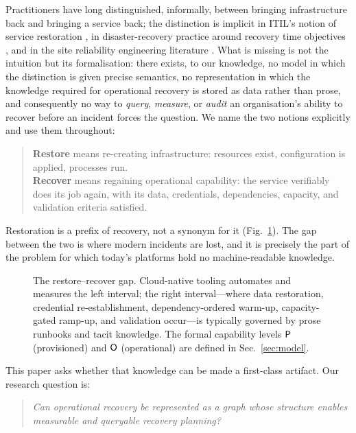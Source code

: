 Practitioners have long distinguished, informally, between bringing infrastructure back and bringing a service back; the distinction is implicit in ITIL's notion of service restoration \citep{itil2019}, in disaster-recovery practice around recovery time objectives \citep{nist2010contingency}, and in the site reliability engineering literature \citep{beyer2016sre}. What is missing is not the intuition but its formalisation: there exists, to our knowledge, no model in which the distinction is given precise semantics, no representation in which the knowledge required for operational recovery is stored as data rather than prose, and consequently no way to \emph{query}, \emph{measure}, or \emph{audit} an organisation's ability to recover before an incident forces the question. We name the two notions explicitly and use them throughout:

\begin{quote}
\textbf{Restore} means re-creating infrastructure: resources exist, configuration is applied, processes run.\\
\textbf{Recover} means regaining operational capability: the service verifiably does its job again, with its data, credentials, dependencies, capacity, and validation criteria satisfied.
\end{quote}

\noindent Restoration is a prefix of recovery, not a synonym for it (Fig.~\ref{fig:gap}). The gap between the two is where modern incidents are lost, and it is precisely the part of the problem for which today's platforms hold no machine-readable knowledge.

\begin{figure}[t]
  \centering
  
  \caption{The restore--recover gap. Cloud-native tooling automates and measures the left interval; the right interval---where data restoration, credential re-establishment, dependency-ordered warm-up, capacity-gated ramp-up, and validation occur---is typically governed by prose runbooks and tacit knowledge. The formal capability levels $\mathsf{P}$ (provisioned) and $\mathsf{O}$ (operational) are defined in Sec.~\ref{sec:model}.}
  \label{fig:gap}
\end{figure}

This paper asks whether that knowledge can be made a first-class artifact. Our research question is:

\begin{quote}
\emph{Can operational recovery be represented as a graph whose structure enables measurable and queryable recovery planning?}
\end{quote}

